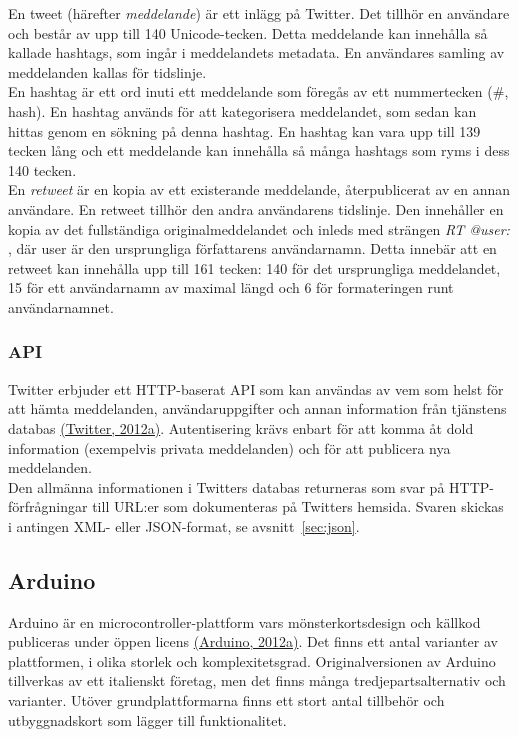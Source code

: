 \documentclass[a4paper,11pt]{article}
\begin{document}
En tweet (härefter {\it meddelande}) är ett inlägg på Twitter. Det tillhör en användare och består av upp till 140 Unicode-tecken. Detta meddelande kan innehålla så kallade hashtags, som ingår i meddelandets metadata. En användares samling av meddelanden kallas för tidslinje. \\

En hashtag är ett ord inuti ett meddelande som föregås av ett nummertecken ({\#}, hash). En hashtag används för att kategorisera meddelandet, som sedan kan hittas genom en sökning på denna hashtag. En hashtag kan vara upp till 139 tecken lång och ett meddelande kan innehålla så många hashtags som ryms i dess 140 tecken. \\

En {\it retweet} är en kopia av ett existerande meddelande, återpublicerat av en annan användare. En retweet tillhör den andra användarens tidslinje. Den innehåller en kopia av det fullständiga originalmeddelandet och inleds med strängen {\it RT @user: }, där user är den ursprungliga författarens användarnamn. Detta innebär att en retweet kan innehålla upp till 161 tecken: 140 för det ursprungliga meddelandet, 15 för ett användarnamn av maximal längd och 6 för formateringen runt användarnamnet.

\subsubsection{API}
\label{twitterapi}
Twitter erbjuder ett HTTP-baserat API som kan användas av vem som helst för att hämta meddelanden, användaruppgifter och annan information från tjänstens databas \hyperref[twitter]{(Twitter, 2012a)}. Autentisering krävs enbart för att komma åt dold information (exempelvis privata meddelanden) och för att publicera nya meddelanden.\\

Den allmänna informationen i Twitters databas returneras som svar på HTTP-förfrågningar till URL:er som dokumenteras på Twitters hemsida. Svaren skickas i antingen XML- eller JSON-format, se avsnitt~\ref{sec:json}.

\subsection{Arduino}
Arduino är en microcontroller-plattform vars mönsterkortsdesign och källkod publiceras under öppen licens \hyperref[arduino]{(Arduino, 2012a)}. Det finns ett antal varianter av plattformen, i olika storlek och komplexitetsgrad. Originalversionen av Arduino tillverkas av ett italienskt företag, men det finns många tredjepartsalternativ och varianter. Utöver grundplattformarna finns ett stort antal tillbehör och utbyggnadskort som lägger till funktionalitet.\\
\end{document}
